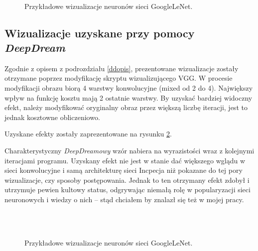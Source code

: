 \begin{figure}
~
\caption{Przykładowe wizualizacje neuronów sieci GoogleLeNet.}
\label{fig:incOtherVis}
\end{figure}

\subsection{Wizualizacje uzyskane przy pomocy \textit{DeepDream}}
Zgodnie z opisem z podrozdziału \ref{ddopis}, prezentowane wizualizacje zostały otrzymane poprzez modyfikację skryptu wizualizującego VGG. W procesie modyfikacji obrazu biorą 4 warstwy konwolucyjne (mixed od 2 do 4). Największy wpływ na funkcję kosztu mają 2 ostatnie warstwy. By uzyskać bardziej widoczny efekt, należy modyfikować oryginalny obraz przez większą liczbę iteracji, jest to jednak kosztowne obliczeniowo.

Uzyskane efekty zostały zaprezentowane na rysunku \ref{fig:deepdream}.

Charakterystyczny \textit{DeepDreamowy} wzór nabiera na wyrazistości wraz z kolejnymi iteracjami programu. Uzyskany efekt nie jest w stanie dać większego wglądu w sieci konwolucyjne i samą architekturę sieci Incpecja niż pokazane do tej pory wizualizacje, czy sposoby postępowania. Jednak to ten otrzymany efekt zdobył i utrzymuje pewien kultowy status, odgrywając niemałą rolę w popularyzacji sieci neuronowych i wiedzy o nich -- stąd chciałem by znalazł się też w mojej pracy.

\begin{figure}
~
\\
~
\caption{Przykładowe wizualizacje neuronów sieci GoogleLeNet.}
\label{fig:deepdream}
\end{figure}

